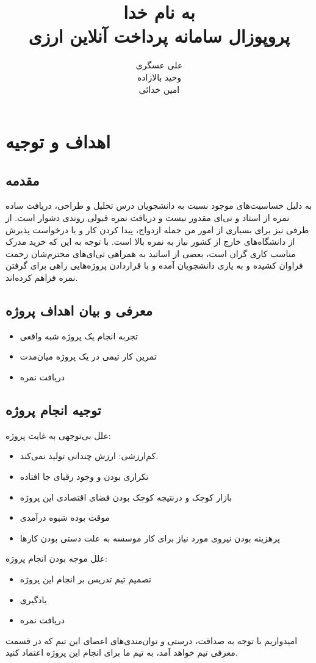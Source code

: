 \documentclass{article}
\title{به نام خدا\\پروپوزال سامانه پرداخت آنلاین ارزی}
\author{علی عسگری\\ وحید بالازاده \\ امین خدائی}
\begin{document}
\maketitle
\section{اهداف و توجیه}
\subsection{مقدمه}
به دلیل حساسیت‌های موجود نسبت به دانشجویان درس تحلیل و طراحی، دریافت ساده نمره از استاد و تی‌ای مقدور نیست و دریافت نمره‌ قبولی روندی دشوار است. از طرفی نیز برای بسیاری از امور من جمله ازدواج، پیدا کردن کار و یا درخواست پذیرش از دانشگاه‌های خارج از کشور نیاز به نمره‌ بالا است. با توجه به این که خرید مدرک مناسب کاری گران است، بعضی از اساتید به همراهی تی‌ای‌های محترم‌شان زحمت فراوان کشیده و به یاری دانشجویان آمده و با قراردادن پروژه‌‌هایی راهی برای گرفتن نمره فراهم کرده‌اند.
\subsection{معرفی و بیان اهداف پروژه}
\begin{itemize}
\item
تجربه انجام یک پروژه شبه واقعی
\item
تمرین کار تیمی در یک پروژه میان‌مدت
\item
دریافت نمره
\end{itemize}
\subsection{توجیه انجام پروژه}
علل بی‌توجهی به غایت پروژه:
\begin{itemize}
\item
کم‌ارزشی: ارزش چندانی تولید نمی‌کند.
\item
تکراری بودن و وجود رقبای جا افتاده
\item
بازار کوچک و درنتیجه کوچک بودن فضای اقتصادی این پروژه
\item
موقت بوده شیوه درآمدی
\item
پرهزینه بودن نیروی مورد نیاز برای کار موسسه به علت دستی بودن کار‌ها
\end{itemize}
علل موجه بودن انجام پروژه:
\begin{itemize}
\item
تصمیم تیم تدریس بر انجام این پروژه
\item
یادگیری
\item
دریافت نمره
\end{itemize}
امیدواریم با توجه به صداقت، درستی و توان‌مندی‌های اعضای این تیم که در قسمت معرفی تیم خواهد آمد، به تیم ما برای انجام این پروژه اعتماد کنید.
\end{document}
